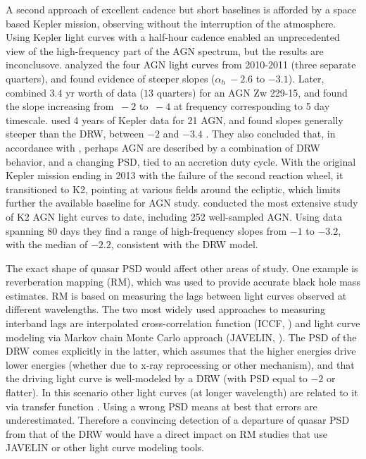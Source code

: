 \documentclass[twocolumn]{aastex62}
\begin{document}
A second approach of excellent cadence but short baselines  is afforded by a space based Kepler mission\cite{borucki2010}, observing without the interruption of the atmosphere. Using Kepler light curves   with a half-hour cadence enabled an unprecedented view of the high-frequency part of the AGN spectrum, but the results are inconclusove. \cite{mushotzky2011}  analyzed the four AGN light curves from 2010-2011 (three separate quarters), and found evidence of steeper slopes ($\alpha_{h} ~ -2.6 $ to $ -3.1$).  Later,  \cite{edelson2014} combined $3.4$ yr worth of data ($13$ quarters)  for an AGN Zw 229-15, and found the slope increasing from $~ -2 $ to $~ -4 $ at frequency corresponding to 5 day timescale. \cite{smith2018} used 4 years of Kepler data for 21 AGN,  and found slopes generally steeper than the DRW, between $-2$ and $-3.4$ . They also concluded that, in accordance with \cite{caplar2017}, perhaps AGN are described by a combination of DRW behavior, and a changing PSD, tied to an accretion duty cycle. With the original  Kepler  mission ending in   2013 with the failure of the second reaction wheel,  it transitioned to K2, pointing at various fields around the ecliptic, which limits further the available baseline for AGN study.  \citep{aranzana2018} conducted the most extensive study of K2 AGN light curves to date, including 252 well-sampled AGN. Using data spanning 80 days they find a range of high-frequency slopes from $-1$ to $-3.2$, with the median of $-2.2$,  consistent with the DRW model.



The exact shape of quasar PSD would affect other areas of study. One example is reverberation mapping (RM), which was used to provide  accurate black hole mass estimates. RM is based on measuring the lags between light curves observed at different wavelengths. The two most widely used approaches to measuring interband lags are interpolated cross-correlation function (ICCF, \citealt{gaskell1987, peterson2004})  and  light curve modeling via Markov chain Monte Carlo approach (JAVELIN, \citealt{zu2011}). The PSD of the DRW comes explicitly in the latter,  which assumes that the higher energies drive lower energies (whether due to x-ray reprocessing or other mechanism), and that the driving light curve is well-modeled by a DRW (with PSD equal to  $-2$ or flatter).  In this scenario other light curves (at longer wavelength) are related to it via transfer function \cite{edelson2019}. Using a wrong PSD means at best that errors are underestimated. Therefore a convincing detection of a departure of quasar PSD from that of the DRW  would have  a direct impact on RM studies that use  JAVELIN or other light curve modeling tools. 
\end{document}
